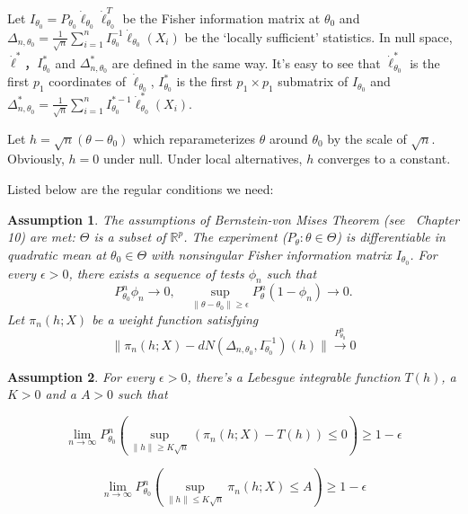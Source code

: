 \documentclass[3p]{elsarticle}
\newtheorem{assumption}{\quad\quad Assumption}
\begin{document}
Let $I_{\theta_0}=P_{\theta_0}\dot{\ell}_{\theta_0}\dot{\ell}_{\theta_0}^T$ be the Fisher information matrix at $\theta_0$ and $\Delta_{n,\theta_0}=\frac{1}{\sqrt{n}}\sum_{i=1}^n I_{\theta_0}^{-1}\dot{\ell}_{\theta_0}(X_i)$ be the `locally sufficient' statistics. In null space, $\dot{\ell}^*$，$I^*_{\theta_0}$ and $\Delta_{n,\theta_0}^*$ are defined in the same way. It's easy to see that $\dot{\ell}^*_{\theta_0}$ is the first $p_1$
coordinates of $\dot{\ell}_{\theta_0}$, $I^*_{\theta_0}$ is the  first $p_1\times p_1$ submatrix of $I_{\theta_0}$ and $\Delta_{n,\theta_0}^*=\frac{1}{\sqrt{n}}\sum_{i=1}^n I_{\theta_0}^{*-1}\dot{\ell}^*_{\theta_0}(X_i)$.

Let $h=\sqrt{n}(\theta-\theta_0)$ which reparameterizes $\theta$ around $\theta_0$ by the scale of $\sqrt{n}$.  Obviously, $h=0$ under null. Under local alternatives, $h$ converges to a constant.

Listed below are the regular conditions we need:

\begin{assumption}\label{Assumption1}
    The assumptions of Bernstein-von Mises Theorem (see~\cite{van2000asymptotic} Chapter 10) are met:  $\Theta$ is a subset of $\mathbb{R}^p$. The experiment ($P_{\theta}:\theta\in\Theta$) is differentiable in quadratic mean at $\theta_0\in \Theta$ with nonsingular Fisher information matrix $I_{\theta_0}$. For every $\epsilon>0$, there exists a sequence of tests $\phi_n$ such that
        \begin{equation}
            P_{\theta_0}^n\phi_n\to 0,\quad \sup_{\|\theta-\theta_0\|\geq \epsilon} P_\theta^n(1-\phi_n)\to 0.
        \end{equation}
        Let $\pi_n(h;X)$ be a weight function satisfying 
        \begin{equation}\label{vonMisesResults}
            \|\pi_n(h;X)-dN(\Delta_{n,\theta_0},I_{\theta_0}^{-1})(h)\|\overset{P_{\theta_0}^n}{\to}0
        \end{equation}
\end{assumption}     
        
\begin{assumption}\label{Assumption2}
        For every $\epsilon>0$, there's a Lebesgue integrable function $T(h)$, a $K>0$ and a $A>0$ such that 

    \begin{equation}\label{Assump21}
    \lim_{n\to \infty}P_{\theta_0}^n(\sup_{\|h\|\geq K\sqrt{n}}(\pi_n(h;X)-T(h))\leq 0)\geq 1-\epsilon
\end{equation}

        \begin{equation}\label{Assump22}
            \lim_{n\to \infty} P_{\theta_0}^n(\sup_{\|h\|\leq K\sqrt{n}} \pi_n(h;X)\leq A)\geq 1-\epsilon
        \end{equation}
\end{assumption}
\end{document}
